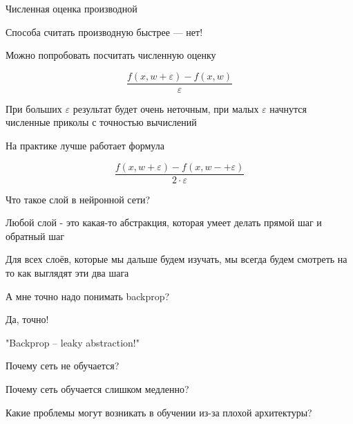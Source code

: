 \documentclass[notes,12pt, aspectratio=169]{beamer}
\newenvironment{wideitemize}{\itemize\addtolength{\itemsep}{10pt}}{\enditemize}
\begin{document}
\begin{frame}{Численная оценка производной}
	\begin{wideitemize}
		\item  \alert{Способа считать производную быстрее —  нет!} 
		
		\item Можно попробовать посчитать численную оценку
		
		\[
		\frac{f(x, w + \varepsilon) -  f(x, w)}{ \varepsilon}
		\]
		
		\item При больших $ \varepsilon$ результат будет очень неточным, при малых  $\varepsilon$ начнутся \alert{численные приколы} с точностью вычислений
		
		\item На практике лучше работает формула
		
		\[
		\frac{f(x, w + \varepsilon) -  f(x, w -  + \varepsilon)}{ 2 \cdot \varepsilon}
		\]
		
	\end{wideitemize}
\end{frame}


\begin{frame}{Что такое слой в нейронной сети?}
	\begin{wideitemize}
		\item Любой слой - это какая-то абстракция, которая умеет делать прямой шаг и обратный шаг
	
		\item Для всех слоёв, которые мы дальше будем изучать, мы всегда будем смотреть на то как выглядят эти два шага
	\end{wideitemize}
\end{frame}


\begin{frame}{А мне точно надо понимать backprop?}
	\begin{wideitemize}
		\item  \alert{Да, точно!} 
				
		\item  "Backprop – leaky abstraction!"
		
		\item  Почему сеть не обучается?
		
		\item  Почему сеть обучается слишком медленно? 
		
		\item  Какие проблемы могут возникать в обучении из-за плохой архитектуры? 
	\end{wideitemize}
\end{frame}
\end{document}
